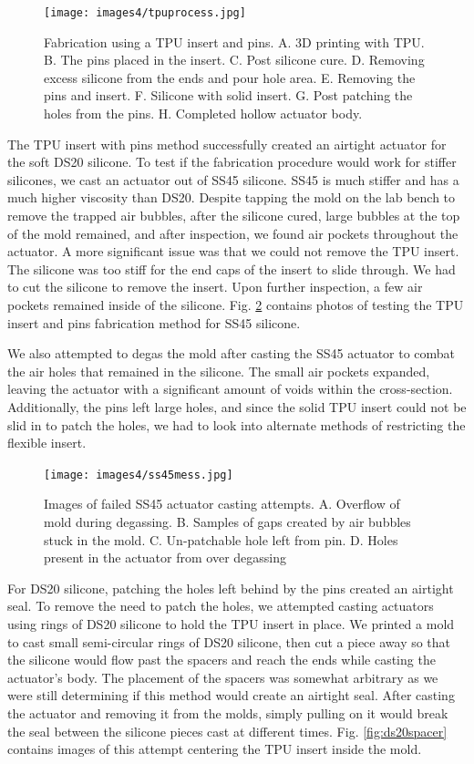 \begin{figure}[!ht]
    \centering
    \texttt{[image: images4/tpuprocess.jpg]}
    \caption{Fabrication using a TPU insert and pins. A. 3D printing with TPU. B. The pins placed in the insert.  C. Post silicone cure. D. Removing excess silicone from the ends and pour hole area. E. Removing the pins and insert. F. Silicone with solid insert. G. Post patching the holes from the pins. H. Completed hollow actuator body.}
    \label{fig:tpuprocess}
\end{figure}

The TPU insert with pins method successfully created an airtight actuator for the soft DS20 silicone. To test if the fabrication procedure would work for stiffer silicones, we cast an actuator out of SS45 silicone. SS45 is much stiffer and has a much higher viscosity than DS20. Despite tapping the mold on the lab bench to remove the trapped air bubbles, after the silicone cured, large bubbles at the top of the mold remained, and after inspection, we found air pockets throughout the actuator. A more significant issue was that we could not remove the TPU insert. The silicone was too stiff for the end caps of the insert to slide through. We had to cut the silicone to remove the insert. Upon further inspection, a few air pockets remained inside of the silicone. Fig. \ref{fig:ss45mess} contains photos of testing the TPU insert and pins fabrication method for SS45 silicone. 

We also attempted to degas the mold after casting the SS45 actuator to combat the air holes that remained in the silicone. The small air pockets expanded, leaving the actuator with a significant amount of voids within the cross-section. Additionally, the pins left large holes, and since the solid TPU insert could not be slid in to patch the holes, we had to look into alternate methods of restricting the flexible insert. 

\begin{figure}[ht]
    \centering
    \texttt{[image: images4/ss45mess.jpg]}
    \caption{Images of failed SS45 actuator casting attempts. A. Overflow of mold during degassing. B. Samples of gaps created by air bubbles stuck in the mold. C. Un-patchable hole left from pin. D. Holes present in the actuator from over degassing}
    \label{fig:ss45mess}
\end{figure}

For DS20 silicone, patching the holes left behind by the pins created an airtight seal. To remove the need to patch the holes, we attempted casting actuators using rings of DS20 silicone to hold the TPU insert in place. We printed a mold to cast small semi-circular rings of DS20 silicone, then cut a piece away so that the silicone would flow past the spacers and reach the ends while casting the actuator's body. The placement of the spacers was somewhat arbitrary as we were still determining if this method would create an airtight seal. After casting the actuator and removing it from the molds, simply pulling on it would break the seal between the silicone pieces cast at different times. Fig. \ref{fig:ds20spacer} contains images of this attempt centering the TPU insert inside the mold. 

